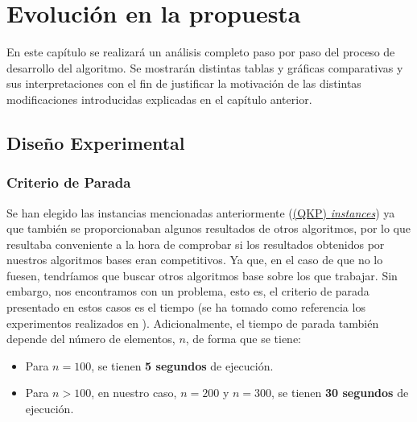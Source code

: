 \chapter{Evolución en la propuesta}\label{Chapter8}

En este capítulo se realizará un análisis completo paso por paso del proceso de desarrollo del algoritmo. 
Se mostrarán distintas tablas y gráficas comparativas y sus interpretaciones con el fin de justificar la motivación de las distintas modificaciones introducidas explicadas en el capítulo anterior.

\section{Diseño Experimental}
\subsection{Criterio de Parada}

Se han elegido las instancias mencionadas anteriormente (\href{http://cedric.cnam.fr/~soutif/QKP/QKP.html}{(QKP) \textit{instances}}) ya que también se proporcionaban algunos resultados de otros algoritmos, por lo que resultaba conveniente a la hora de comprobar si los resultados obtenidos por nuestros algoritmos bases eran competitivos. 
Ya que, en el caso de que no lo fuesen, tendríamos que buscar otros algoritmos base sobre los que trabajar.
Sin embargo, nos encontramos con un problema, esto es, el criterio de parada presentado en estos casos es el tiempo (se ha tomado como referencia los experimentos realizados en \parencite{garcia-martinezStrategicOscillationQuadratic2014}).
Adicionalmente, el tiempo de parada también depende del número de elementos, $n$, de forma que se tiene:
\begin{itemize}
\item Para $n = 100$, se tienen \textbf{5 segundos} de ejecución.
\item Para $n > 100$, en nuestro caso, $n = 200$ y $n = 300$, se tienen \textbf{30 segundos} de ejecución.
\end{itemize}

